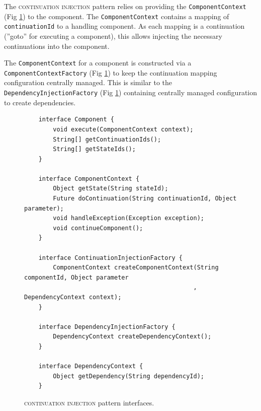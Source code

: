 \documentclass[prodmode]{style/acmlarge}
\begin{document}
The \textsc{continuation injection} pattern relies on providing the
\texttt{ComponentContext} (Fig \ref{fig:ContinuationInjectionInterfaces}) to the
component.  The \texttt{ComponentContext} contains a mapping of
\texttt{continuationId} to a handling component.  As each mapping is a
continuation (''goto'' for executing a component), this allows injecting the
necessary continuations into the component.

The \texttt{ComponentContext} for a component is constructed via a
\texttt{ComponentContextFactory} (Fig \ref{fig:ContinuationInjectionInterfaces})
to keep the continuation mapping configuration centrally managed.  This is
similar to the \texttt{DependencyInjectionFactory} (Fig
\ref{fig:ContinuationInjectionInterfaces}) containing centrally managed
configuration to create dependencies.

\begin{figure}[tp]
\centering
\begin{verbatim}
    interface Component {
        void execute(ComponentContext context);
        String[] getContinuationIds();
        String[] getStateIds();
    }

    interface ComponentContext {
        Object getState(String stateId);
        Future doContinuation(String continuationId, Object parameter);
        void handleException(Exception exception);
        void continueComponent();
    }
    
    interface ContinuationInjectionFactory {
        ComponentContext createComponentContext(String componentId, Object parameter
                                               , DependencyContext context);
    }
    
    interface DependencyInjectionFactory {
        DependencyContext createDependencyContext();
    }
    
    interface DependencyContext {
        Object getDependency(String dependencyId);
    }
\end{verbatim}
\caption{\textsc{continuation injection} pattern interfaces\footnotemark.}
\label{fig:ContinuationInjectionInterfaces}
\end{figure}
\end{document}
